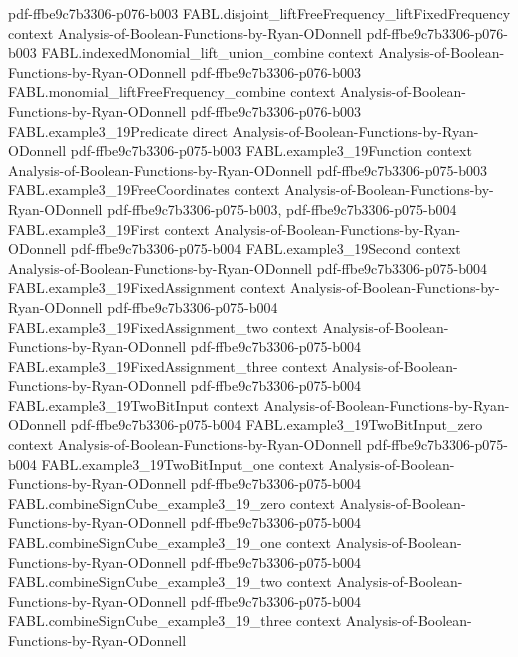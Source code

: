\begin{theorem}
  {pdf-ffbe9c7b3306-p076-b003}
\proofstep
  {FABL.disjoint_liftFreeFrequency_liftFixedFrequency}
  {context}
  {Analysis-of-Boolean-Functions-by-Ryan-ODonnell}
  {pdf-ffbe9c7b3306-p076-b003}
\proofstep
  {FABL.indexedMonomial_lift_union_combine}
  {context}
  {Analysis-of-Boolean-Functions-by-Ryan-ODonnell}
  {pdf-ffbe9c7b3306-p076-b003}
\proofstep
  {FABL.monomial_liftFreeFrequency_combine}
  {context}
  {Analysis-of-Boolean-Functions-by-Ryan-ODonnell}
  {pdf-ffbe9c7b3306-p076-b003}
\proofstep
  {FABL.example3_19Predicate}
  {direct}
  {Analysis-of-Boolean-Functions-by-Ryan-ODonnell}
  {pdf-ffbe9c7b3306-p075-b003}
\proofstep
  {FABL.example3_19Function}
  {context}
  {Analysis-of-Boolean-Functions-by-Ryan-ODonnell}
  {pdf-ffbe9c7b3306-p075-b003}
\proofstep
  {FABL.example3_19FreeCoordinates}
  {context}
  {Analysis-of-Boolean-Functions-by-Ryan-ODonnell}
  {pdf-ffbe9c7b3306-p075-b003,
    pdf-ffbe9c7b3306-p075-b004}
\proofstep
  {FABL.example3_19First}
  {context}
  {Analysis-of-Boolean-Functions-by-Ryan-ODonnell}
  {pdf-ffbe9c7b3306-p075-b004}
\proofstep
  {FABL.example3_19Second}
  {context}
  {Analysis-of-Boolean-Functions-by-Ryan-ODonnell}
  {pdf-ffbe9c7b3306-p075-b004}
\proofstep
  {FABL.example3_19FixedAssignment}
  {context}
  {Analysis-of-Boolean-Functions-by-Ryan-ODonnell}
  {pdf-ffbe9c7b3306-p075-b004}
\proofstep
  {FABL.example3_19FixedAssignment_two}
  {context}
  {Analysis-of-Boolean-Functions-by-Ryan-ODonnell}
  {pdf-ffbe9c7b3306-p075-b004}
\proofstep
  {FABL.example3_19FixedAssignment_three}
  {context}
  {Analysis-of-Boolean-Functions-by-Ryan-ODonnell}
  {pdf-ffbe9c7b3306-p075-b004}
\proofstep
  {FABL.example3_19TwoBitInput}
  {context}
  {Analysis-of-Boolean-Functions-by-Ryan-ODonnell}
  {pdf-ffbe9c7b3306-p075-b004}
\proofstep
  {FABL.example3_19TwoBitInput_zero}
  {context}
  {Analysis-of-Boolean-Functions-by-Ryan-ODonnell}
  {pdf-ffbe9c7b3306-p075-b004}
\proofstep
  {FABL.example3_19TwoBitInput_one}
  {context}
  {Analysis-of-Boolean-Functions-by-Ryan-ODonnell}
  {pdf-ffbe9c7b3306-p075-b004}
\proofstep
  {FABL.combineSignCube_example3_19_zero}
  {context}
  {Analysis-of-Boolean-Functions-by-Ryan-ODonnell}
  {pdf-ffbe9c7b3306-p075-b004}
\proofstep
  {FABL.combineSignCube_example3_19_one}
  {context}
  {Analysis-of-Boolean-Functions-by-Ryan-ODonnell}
  {pdf-ffbe9c7b3306-p075-b004}
\proofstep
  {FABL.combineSignCube_example3_19_two}
  {context}
  {Analysis-of-Boolean-Functions-by-Ryan-ODonnell}
  {pdf-ffbe9c7b3306-p075-b004}
\proofstep
  {FABL.combineSignCube_example3_19_three}
  {context}
  {Analysis-of-Boolean-Functions-by-Ryan-ODonnell}

\end{theorem}
